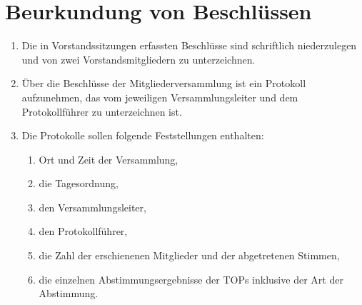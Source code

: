 \documentclass[a4paper,ngerman]{scrartcl}
\begin{document}
\section{Beurkundung von Beschlüssen}
\begin{enumerate}
\item Die in Vorstandssitzungen erfassten Beschlüsse sind schriftlich niederzulegen und von zwei Vorstandsmitgliedern zu unterzeichnen.
\item Über die Beschlüsse der Mitgliederversammlung ist ein Protokoll aufzunehmen, das vom jeweiligen Versammlungsleiter und dem Protokollführer zu unterzeichnen ist.
\item Die Protokolle sollen folgende Feststellungen enthalten:
\begin{enumerate}
\item Ort und Zeit der Versammlung,
\item die Tagesordnung,
\item den Versammlungsleiter,
\item den Protokollführer,
\item die Zahl der erschienenen Mitglieder und der abgetretenen Stimmen,
\item die einzelnen Abstimmungsergebnisse der TOPs inklusive der Art der Abstimmung.
\end{enumerate}
\end{enumerate}
\end{document}

